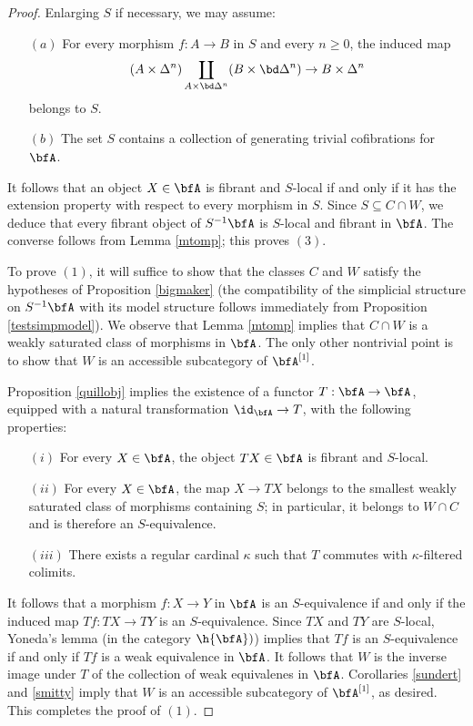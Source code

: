 \begin{proof}
Enlarging $S$ if necessary, we may assume:
\begin{itemize}
\item[$(a)$] For every morphism $f: A \rightarrow B$ in $S$ and every $n \geq 0$, the induced map
$$(A \times \Delta^n) \coprod_{ A \times \bd \Delta^n } (B \times \bd \Delta^n)
\rightarrow B \times \Delta^n$$ belongs to $S$.  
\item[$(b)$] The set $S$ contains a collection of generating trivial cofibrations for $\bfA$.
\end{itemize}
It follows that an object $X \in \bfA$ is fibrant and $S$-local if and only if it has the extension property with respect to every morphism in $S$. Since $S \subseteq C \cap W$, we deduce that every fibrant object of $S^{-1} \bfA$ is $S$-local and fibrant in $\bfA$. The converse follows from Lemma \ref{mtomp}; this proves $(3)$. 

To prove $(1)$, it will suffice to show that the classes $C$ and $W$ satisfy the hypotheses of Proposition \ref{bigmaker} (the compatibility of the simplicial structure on $S^{-1} \bfA$ with its model structure
follows immediately from Proposition \ref{testsimpmodel}). We observe that Lemma \ref{mtomp} implies that $C \cap W$ is a weakly saturated class of morphisms in $\bfA$. The only other nontrivial point is to show that $W$ is an accessible subcategory of $\bfA^{[1]}$.

Proposition \ref{quillobj} implies the existence of a functor $T: \bfA \rightarrow \bfA$, equipped with a natural transformation $\id_{\bfA} \rightarrow T$, with the following properties:
\begin{itemize}
\item[$(i)$] For every $X \in \bfA$, the object $TX \in \bfA$ is fibrant and $S$-local.
\item[$(ii)$] For every $X \in \bfA$, the map $X \rightarrow TX$ belongs to the smallest weakly saturated class of morphisms containing $S$; in particular, it belongs to $W \cap C$ and is therefore an $S$-equivalence.
\item[$(iii)$] There exists a regular cardinal $\kappa$ such that $T$ commutes with $\kappa$-filtered colimits.
\end{itemize}

It follows that a morphism $f: X \rightarrow Y$ in $\bfA$ is an $S$-equivalence if and only if the induced map $Tf: TX \rightarrow TY$ is an $S$-equivalence. Since $TX$ and $TY$ are $S$-local, Yoneda's lemma (in the category $\h{\bfA})$) implies that $Tf$ is an $S$-equivalence if and only if
$Tf$ is a weak equivalence in $\bfA$. It follows that $W$ is the inverse image under $T$ of the collection of weak equivalenes in $\bfA$. Corollaries \ref{sundert} and \ref{smitty} imply that $W$ is an accessible subcategory of $\bfA^{[1]}$, as desired. This completes the proof of $(1)$.


\end{proof}
